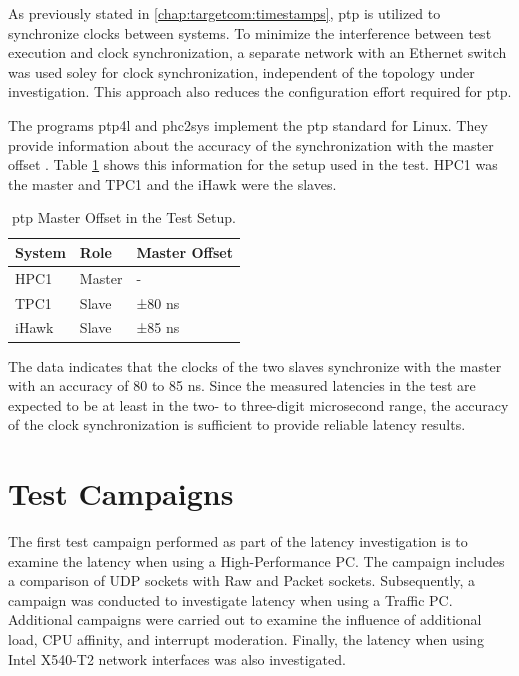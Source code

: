 As previously stated in \ref{chap:targetcom:timestamps}, \ac{ptp} is utilized to synchronize clocks between systems. To minimize the interference between test execution and clock synchronization, a separate network with an Ethernet switch was used soley for clock synchronization, independent of the topology under investigation. This approach also reduces the configuration effort required for \ac{ptp}.

The programs ptp4l and phc2sys implement the \ac{ptp} standard for Linux. They provide information about the accuracy of the synchronization with the master offset \cite{perf02}. Table \ref{tab:PTPMasterOffset} shows this information for the setup used in the test. HPC1 was the master and TPC1 and the iHawk were the slaves.

\begin{table}[h]
\centering
\begin{tabular}{l|l|l}
	\toprule
	\textbf{System} & \textbf{Role} & \textbf{Master Offset} \\
	\midrule
 	HPC1 & Master & - \\ 
 	TPC1 & Slave & ±80 ns \\
 	iHawk & Slave & ±85 ns \\
	\bottomrule
\end{tabular}
\caption{\ac{ptp} Master Offset in the Test Setup.}
\label{tab:PTPMasterOffset}
\end{table}

The data indicates that the clocks of the two slaves synchronize with the master with an accuracy of 80 to 85 ns. Since the measured latencies in the test are expected to be at least in the two- to three-digit microsecond range, the accuracy of the clock synchronization is sufficient to provide reliable latency results.

\clearpage
\section{Test Campaigns}
The first test campaign performed as part of the latency investigation is to examine the latency when using a High-Performance PC. The campaign includes a comparison of UDP sockets with Raw and Packet sockets. Subsequently, a campaign was conducted to investigate latency when using a Traffic PC. Additional campaigns were carried out to examine the influence of additional load, \ac{CPU} affinity, and interrupt moderation. Finally, the latency when using Intel X540-T2 network interfaces was also investigated.

